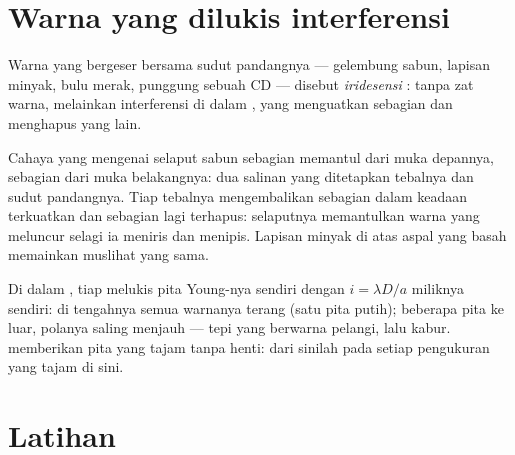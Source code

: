 \section{Warna yang dilukis interferensi}

\begin{definition}[Iridesensi]\label{def:g12:light-as-wave:iridescence}
Warna yang bergeser bersama sudut pandangnya --- gelembung sabun, lapisan
minyak, bulu merak, punggung sebuah CD --- disebut \emph{iridesensi}%
: tanpa zat warna, melainkan interferensi di dalam
, yang menguatkan sebagian  dan
menghapus yang lain.
\end{definition}

\begin{example}\label{ex:g12:light-as-wave:soap}
Cahaya yang mengenai selaput sabun sebagian memantul dari muka depannya,
sebagian dari muka belakangnya: dua salinan  yang  ditetapkan tebalnya dan sudut pandangnya. Tiap tebalnya
mengembalikan sebagian  dalam keadaan terkuatkan dan
sebagian lagi terhapus: selaputnya memantulkan warna yang meluncur
selagi ia meniris dan menipis. Lapisan minyak di atas aspal yang basah
memainkan muslihat yang sama.
\end{example}

\begin{remark}\label{rem:g12:light-as-wave:white}
Di dalam , tiap  melukis pita Young-nya
sendiri dengan $i = \lambda D/a$ miliknya sendiri: di tengahnya semua
warnanya terang (satu pita putih); beberapa pita ke luar, polanya
saling menjauh --- tepi yang berwarna pelangi, lalu kabur.  memberikan pita yang tajam tanpa henti: dari sinilah 
pada setiap pengukuran yang tajam di sini.
\end{remark}

\section{Latihan}


